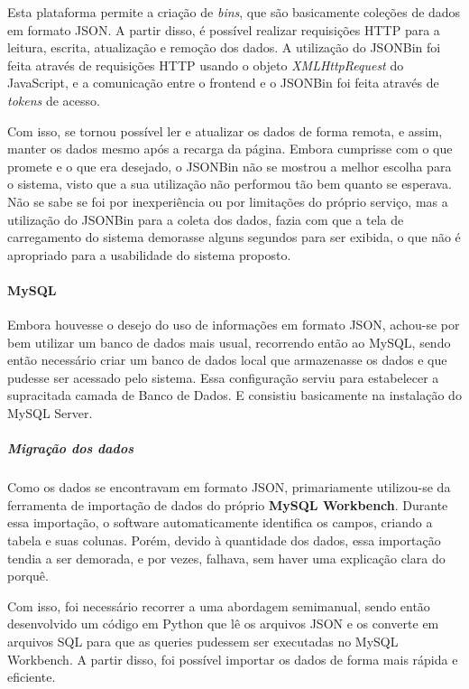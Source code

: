 Esta plataforma permite a criação de \textit{bins}, que são basicamente coleções de dados em formato JSON. A partir disso, é possível realizar requisições HTTP para a leitura, escrita, atualização e remoção dos dados. A utilização do JSONBin foi feita através de requisições HTTP usando o objeto \textit{XMLHttpRequest} do JavaScript, e a comunicação entre o frontend e o JSONBin foi feita através de \textit{tokens} de acesso.

Com isso, se tornou possível ler e atualizar os dados de forma remota, e assim, manter os dados mesmo após a recarga da página. Embora cumprisse com o que promete e o que era desejado, o JSONBin não se mostrou a melhor escolha para o sistema, visto que a sua utilização não performou tão bem quanto se esperava. Não se sabe se foi por inexperiência ou por limitações do próprio serviço, mas a utilização do JSONBin para a coleta dos dados, fazia com que a tela de carregamento do sistema demorasse alguns segundos para ser exibida, o que não é apropriado para a usabilidade do sistema proposto.

\paragraph*{MySQL}

Embora houvesse o desejo do uso de informações em formato JSON, achou-se por bem utilizar um banco de dados mais usual, recorrendo então ao MySQL, sendo então necessário criar um banco de dados local que armazenasse os dados e que pudesse ser acessado pelo sistema. Essa configuração serviu para estabelecer a supracitada camada de Banco de Dados. E consistiu basicamente na instalação do MySQL Server.

\subparagraph*{Migração dos dados}

Como os dados se encontravam em formato JSON, primariamente utilizou-se da ferramenta de importação de dados do próprio \textbf{MySQL Workbench}. Durante essa importação, o software automaticamente identifica os campos, criando a tabela e suas colunas. Porém, devido à quantidade dos dados, essa importação tendia a ser demorada, e por vezes, falhava, sem haver uma explicação clara do porquê.

Com isso, foi necessário recorrer a uma abordagem semimanual, sendo então desenvolvido um código em Python que lê os arquivos JSON e os converte em arquivos SQL para que as queries pudessem ser executadas no MySQL Workbench. A partir disso, foi possível importar os dados de forma mais rápida e eficiente.


